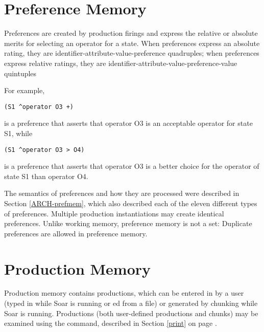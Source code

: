 \section{Preference Memory}
\label{SYNTAX-prefmem}

Preferences are created by production firings and express the
relative or absolute merits for selecting an operator for a state.  When
preferences express an absolute rating, they are
identifier-attribute-value-preference quadruples; when preferences
express relative ratings, they are
identifier-attribute-value-preference-value quintuples

For example, 
\begin{verbatim}
(S1 ^operator O3 +)
\end{verbatim}
is a preference that asserts that operator O3 is an acceptable operator for
state S1, while
\begin{verbatim}
(S1 ^operator O3 > O4)
\end{verbatim}
is a preference that asserts that operator O3 is a better choice for the
operator of state S1 than operator O4.

The semantics of preferences and how they are processed were described in
Section \ref{ARCH-prefmem}, which also described each of the eleven different
types of preferences.  Multiple production instantiations may create identical 
preferences. Unlike working memory, preference memory is not a set: Duplicate 
preferences are allowed in preference memory.
\section{Production Memory}
\label{SYNTAX-pm}


Production memory contains productions, which can be entered in by a user
(typed in while Soar is running or ed from a file) or
generated by chunking while Soar is running. Productions (both
user-defined productions and chunks) may be examined using the
 command, described in Section \ref{print} on page
\pageref{print}.

